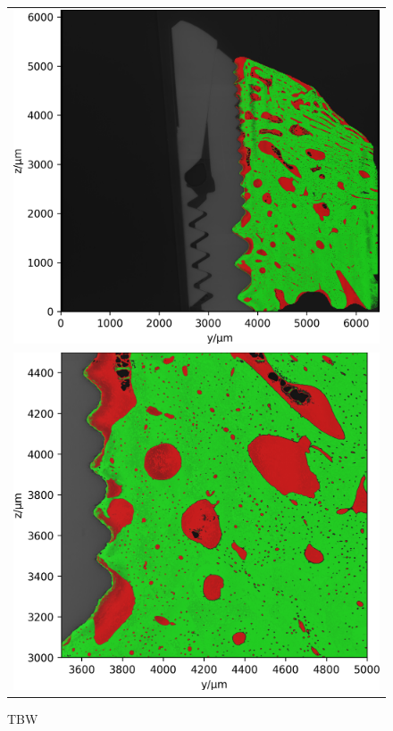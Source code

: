 \begin{figure}
  \centering
  \begin{tabular}{c}
    \includegraphics[width=\linewidth]{figures/770c_pag-full-P01-yz-1x} \\
    \includegraphics[width=\linewidth]{figures/770c_pag-bic-P01-yz-1x}
  \end{tabular}
  \caption{TBW}
  \label{fig:histology-comparison2}
\end{figure}

